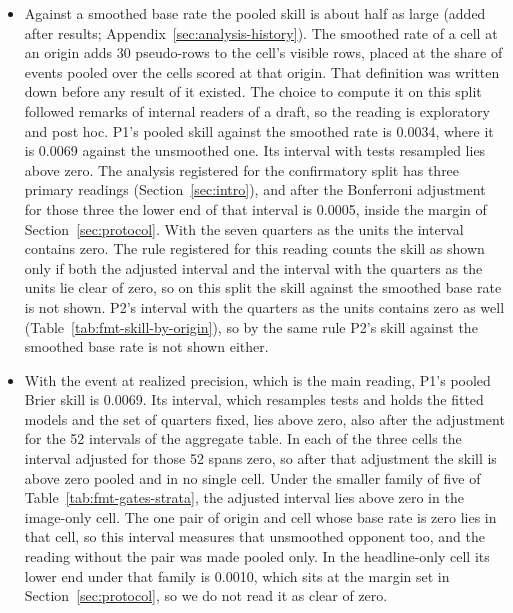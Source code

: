 \begin{itemize}
\item Against a smoothed base rate the pooled skill is about half as large (added after results; Appendix~\ref{sec:analysis-history}). The smoothed rate of a cell at an origin adds 30 pseudo-rows to the cell's visible rows, placed at the share of events pooled over the cells scored at that origin. That definition was written down before any result of it existed. The choice to compute it on this split followed remarks of internal readers of a draft, so the reading is exploratory and post hoc. P1's pooled skill against the smoothed rate is 0.0034, where it is 0.0069 against the unsmoothed one. Its interval with tests resampled lies above zero. The analysis registered for the confirmatory split has three primary readings (Section~\ref{sec:intro}), and after the Bonferroni adjustment for those three the lower end of that interval is 0.0005, inside the margin of Section~\ref{sec:protocol}. With the seven quarters as the units the interval contains zero. The rule registered for this reading counts the skill as shown only if both the adjusted interval and the interval with the quarters as the units lie clear of zero, so on this split the skill against the smoothed base rate is not shown. P2's interval with the quarters as the units contains zero as well (Table~\ref{tab:fmt-skill-by-origin}), so by the same rule P2's skill against the smoothed base rate is not shown either.
\item With the event at realized precision, which is the main reading, P1's pooled Brier skill is 0.0069. Its interval, which resamples tests and holds the fitted models and the set of quarters fixed, lies above zero, also after the adjustment for the 52 intervals of the aggregate table. In each of the three cells the interval adjusted for those 52 spans zero, so after that adjustment the skill is above zero pooled and in no single cell. Under the smaller family of five of Table~\ref{tab:fmt-gates-strata}, the adjusted interval lies above zero in the image-only cell. The one pair of origin and cell whose base rate is zero lies in that cell, so this interval measures that unsmoothed opponent too, and the reading without the pair was made pooled only. In the headline-only cell its lower end under that family is 0.0010, which sits at the margin set in Section~\ref{sec:protocol}, so we do not read it as clear of zero.

\end{itemize}
